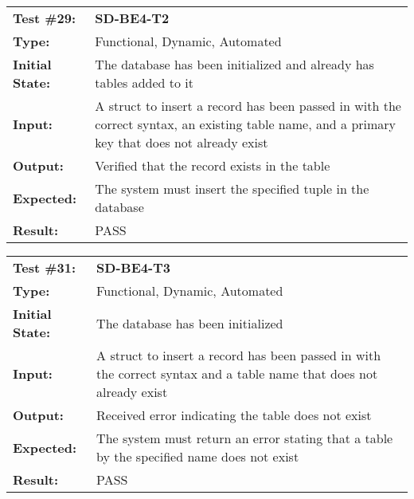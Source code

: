 \documentclass[12pt, titlepage]{article}
\begin{document}
\begin{mdframed}[linewidth=1pt]
\begin{tabularx}{\textwidth}{@{}p{3cm}X@{}}
{\bf Test \#29:} & {\bf SD-BE4-T2}\\[\baselineskip]
{\bf Type:} & Functional, Dynamic, Automated \\[0.5\baselineskip]
{\bf Initial State:} & The database has been initialized and already has tables added to it \\[\baselineskip]
{\bf Input:} & A struct to insert a record has been passed in with the correct syntax, an existing table name, and a primary key that does not already exist \\[\baselineskip]
{\bf Output:} & Verified that the record exists in the table \\[\baselineskip]
{\bf Expected:} & The system must insert the specified tuple in the database \\[\baselineskip]
{\bf Result:} & PASS
\end{tabularx}
\end{mdframed} 

\begin{mdframed}[linewidth=1pt]
\begin{tabularx}{\textwidth}{@{}p{3cm}X@{}}
{\bf Test \#31:} & {\bf SD-BE4-T3}\\[\baselineskip]
{\bf Type:} & Functional, Dynamic, Automated \\[0.5\baselineskip]
{\bf Initial State:} & The database has been initialized \\[\baselineskip]
{\bf Input:} & A struct to insert a record has been passed in with the correct syntax and a table name that does not already exist \\[\baselineskip]
{\bf Output:} & Received error indicating the table does not exist \\[\baselineskip]
{\bf Expected:} & The system must return an error stating that a table by the specified name does not exist \\[\baselineskip]
{\bf Result:} & PASS
\end{tabularx}
\end{mdframed} 
\end{document}
